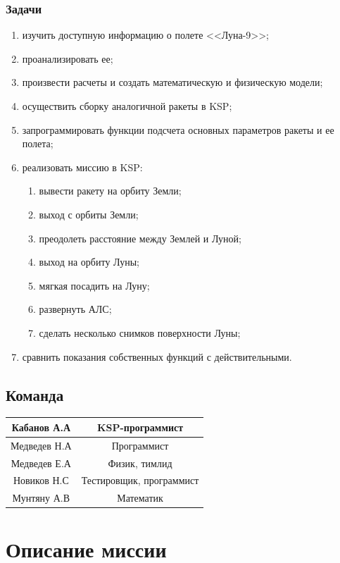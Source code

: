 \subsubsection*{Задачи}
\begin{enumerate}
	\item изучить доступную информацию о полете <<Луна-9>>;
	\item проанализировать ее;
	\item произвести расчеты и создать математическую и физическую модели;
	\item осуществить сборку аналогичной ракеты в KSP;
	\item запрограммировать функции подсчета основных параметров ракеты и ее полета;
	\item реализовать миссию в KSP:
	\begin{enumerate}
		\item вывести ракету на орбиту Земли;
		\item выход с орбиты Земли;
		\item преодолеть расстояние между Землей и Луной;
		\item выход на орбиту Луны;
		\item мягкая посадить на Луну;
		\item развернуть АЛС;
		\item сделать несколько снимков поверхности Луны;
	\end{enumerate}
	\item сравнить показания собственных функций с действительными.
\end{enumerate}
\subsection*{Команда}
\begin{tabular}{|c|c|}
	\hline 
	Кабанов А.А	& KSP-программист \\
	\hline
	Медведев Н.А & Программист \\
	\hline
	Медведев Е.А & Физик, тимлид \\ 
	\hline
	Новиков Н.С & Тестировщик, программист \\ 
	\hline
	Мунтяну А.В	& Математик \\
	\hline
\end{tabular}


\section{Описание миссии}
